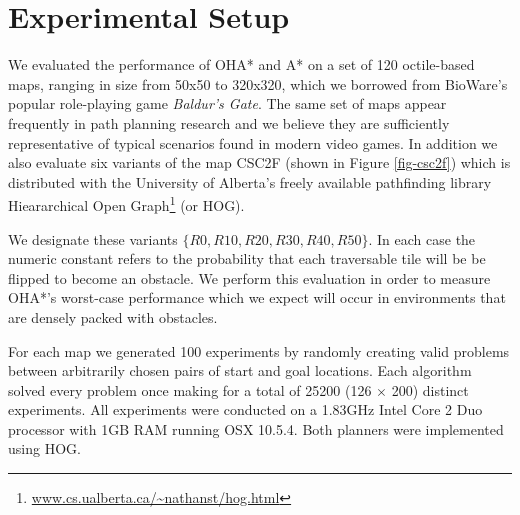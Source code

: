 \section{Experimental Setup}
We evaluated the performance of OHA* and A* on a set of 120 octile-based maps, ranging in size from 50x50 
to 320x320, which we borrowed from BioWare's popular role-playing game \emph{Baldur's Gate}. 
The same set of maps appear frequently in path planning research 
\cite{botea04,bjornsson05,bjornsson06,harabor08} and we believe they are sufficiently representative 
of typical scenarios found in modern video games.
In addition we also evaluate six variants of the map CSC2F (shown in Figure \ref{fig-csc2f}) which is distributed with the University of Alberta's freely available pathfinding library 
Hieararchical Open Graph\footnote{\url{www.cs.ualberta.ca/~nathanst/hog.html}} (or HOG).


We designate these variants $\lbrace R0, R10, R20, R30, R40, R50 \rbrace$. 
In each case the numeric constant refers to the probability that each traversable tile will be be flipped to 
become an obstacle.
We perform this evaluation in order to measure OHA*'s worst-case performance which we expect will occur in 
environments that are densely packed with obstacles.
\par
For each map we generated 100 experiments by randomly creating valid problems between arbitrarily chosen 
pairs of start and goal locations.
Each algorithm solved every problem once making for a total of 25200 (126 $\times$ 200) distinct experiments.
All experiments were conducted on a 1.83GHz Intel Core 2 Duo processor with 1GB RAM running OSX 10.5.4.
Both planners were implemented using HOG. 
